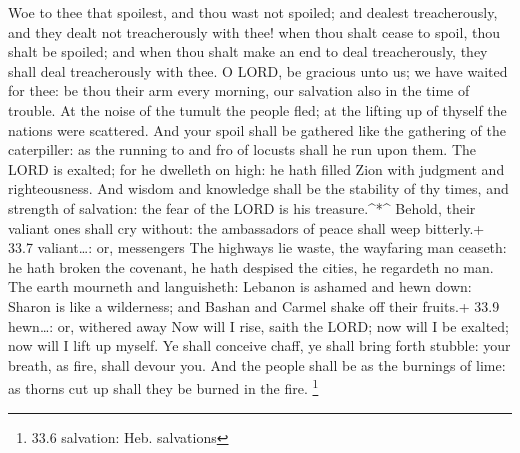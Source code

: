  Woe to thee that spoilest, and thou wast not spoiled; and
dealest treacherously, and they dealt not treacherously with thee! when
thou shalt cease to spoil, thou shalt be spoiled; and when thou shalt
make an end to deal treacherously, they shall deal treacherously with
thee.  O LORD, be gracious unto us; we have waited for thee:
be thou their arm every morning, our salvation also in the time of
trouble.  At the noise of the tumult the people fled; at the
lifting up of thyself the nations were scattered.  And your
spoil shall be gathered like the gathering of the caterpiller: as the
running to and fro of locusts shall he run upon them.  The
LORD is exalted; for he dwelleth on high: he hath filled Zion with
judgment and righteousness.  And wisdom and knowledge shall
be the stability of thy times, and strength of salvation: the fear of
the LORD is his treasure.\^{}*\^{}  Behold, their valiant
ones shall cry without: the ambassadors of peace shall weep bitterly.+
33.7 valiant\ldots: or, messengers  The highways lie waste,
the wayfaring man ceaseth: he hath broken the covenant, he hath despised
the cities, he regardeth no man.  The earth mourneth and
languisheth: Lebanon is ashamed and hewn down: Sharon is like a
wilderness; and Bashan and Carmel shake off their fruits.+ 33.9
hewn\ldots: or, withered away  Now will I rise, saith the
LORD; now will I be exalted; now will I lift up myself.  Ye
shall conceive chaff, ye shall bring forth stubble: your breath, as
fire, shall devour you.  And the people shall be as the
burnings of lime: as thorns cut up shall they be burned in the fire.
\footnote{33.6 salvation: Heb. salvations}


